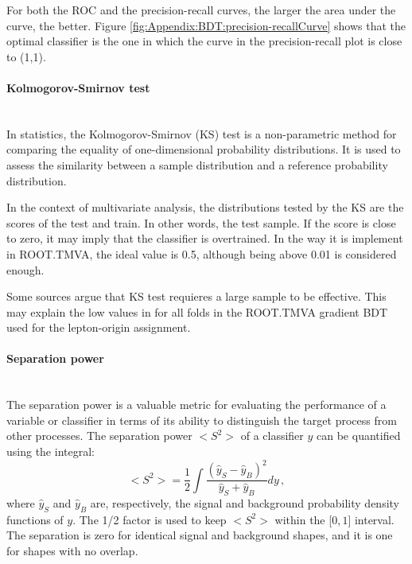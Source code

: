 For both the ROC and the precision-recall curves, the larger the area under the curve, the better.
Figure \ref{fig:Appendix:BDT:precision-recallCurve} shows that the optimal classifier is the one in 
which the curve in the precision-recall plot is close to (1,1).


\paragraph{Kolmogorov-Smirnov test}\mbox{}\\
In statistics, the Kolmogorov-Smirnov (KS) test is a non-parametric method for comparing the equality 
of one-dimensional probability distributions. It is used to assess the similarity between 
a sample distribution and a reference probability distribution.

In the context of multivariate analysis, 
the distributions tested by the KS are the scores of the test and train. In other words, 
the test sample. If the score is close to zero, it may imply that the classifier is overtrained.
In the way it is implement in ROOT.TMVA, the ideal value is 0.5, although being above 0.01 is
considered enough.


Some sources argue that KS test requieres a large sample to be effective.
This  may explain the low values in for all folds in the ROOT.TMVA gradient
BDT used for the lepton-origin assignment.

 
\paragraph{Separation power}\mbox{}\\
The separation power is a valuable metric for evaluating the performance 
of a variable or classifier in terms of its ability to distinguish the target process 
from other processes. The separation power $<S^{2}>$ of a classifier $y$ can 
be quantified using the integral:
\begin{equation}\label{eq:Appendix:BDT:SeparationPower}
	<S^{2}> = \frac{1}{2}\int \frac{(\hat{y}_{S} - \hat{y}_{B})^{2}}{\hat{y}_{S}+\hat{y}_{B}}dy \, ,
\end{equation}
where $\hat{y}_{S}$ and $\hat{y}_{B}$ are, respectively, the signal and background probability 
density functions of $y$.  The 1/2 factor is used to keep $<S^{2}>$ within the [$0, 1$] interval.
The separation is zero for identical signal and background shapes, and 
it is one for shapes with no overlap.



